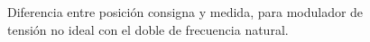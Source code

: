 \documentclass[a4paper, 10pt, onecolumn,journal]{ieeeconf}
\begin{document}
\begin{figure}[H]
	\centering
	\begin{adjustbox}{scale=0.55,max width=\columnwidth}
	\end{adjustbox}
	\caption{Diferencia entre posición consigna y medida, para modulador de tensión no ideal con el doble de frecuencia natural.}
	\label{Diferencia entre posición consigna y medida, para modulador de tensión no ideal con el doble de frecuencia natural}
\end{figure}
\end{document}
